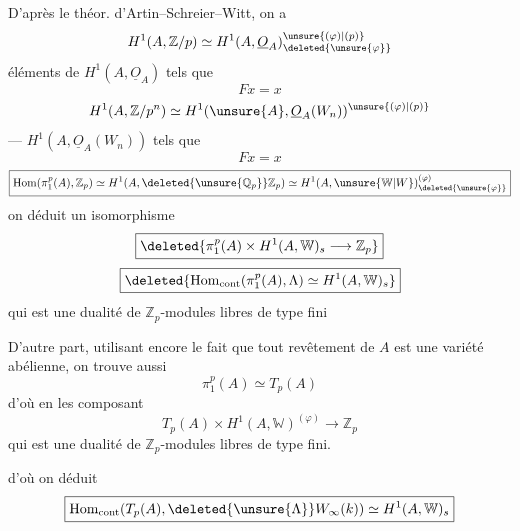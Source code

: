 D'après le théor. d'Artin--Schreier--Witt, on a
\[
H^1(A,\mathbb Z/p)\simeq H^1(A,\underline O_A)^{\unsure{(\varphi)|(p)}}_{\deleted{\unsure{\varphi}}}
\]
éléments de $H^1(A,\underline O_A)$ tels que
\[Fx=x\]
\[
H^1(A,\mathbb Z/p^n)\simeq H^1(\unsure{A},\underline O_A(W_n))^{\unsure{(\varphi)|(p)}}
\]
--- $H^1(A,\underline O_A(W_n))$ tels que
\[Fx=x\]
\[
\boxed{\operatorname{Hom}(\pi_1^p(A),\mathbb Z_p)\simeq H^1(A,\deleted{\unsure{\mathbb Q_p}}\mathbb Z_p)
\simeq H^1(A,\unsure{\mathbb W|W})^{(\varphi)}_{\deleted{\unsure{\varphi}}}}
\]
  on déduit un  isomorphisme
\[
\boxed{\deleted{\pi_1^p(A)\times H^1(A,\mathbb W)_s\longrightarrow\mathbb Z_p}}
\]
\[
\boxed{\deleted{\operatorname{Hom}_{\mathrm{cont}}(\pi_1^p(A),\Lambda)\simeq H^1(A,\mathbb W)_s}}
\]
qui est une dualité  de $\mathbb Z_p$-modules libres de type fini

D'autre part, utilisant encore le fait que tout revêtement de $A$ est une variété abélienne, on trouve aussi
\[\boxed{\pi_1^p(A)\simeq T_p(A)}\]
d'où en les composant
\[\boxed{T_p(A)\times H^1(A,\mathbb W)^{(\varphi)}\longrightarrow\mathbb Z_p}\]
qui est une dualité de $\mathbb Z_p$-modules libres de type fini.

 d'où on déduit
\[
\boxed{\operatorname{Hom}_{\mathrm{cont}}(T_p(A),\deleted{\unsure{\Lambda}}W_\infty(k))\simeq H^1(A,\mathbb W)_s}
\]
